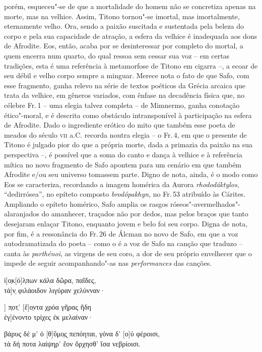 {porém, esqueceu"-se de que a mortalidade do homem não se concretiza apenas na
morte, mas na velhice. Assim, Titono tornou"-se imortal, mas imortalmente,
eternamente velho. Ora, sendo a paixão suscitada e sustentada pela
beleza do corpo e pela sua capacidade de atração, a esfera da velhice é
inadequada aos dons de Afrodite. Eos, então, acaba por se desinteressar por
completo do mortal, a quem encerra num quarto, do qual ressoa sem cessar sua
voz -- em certas tradições, esta é uma referência à metamorfose de Titono em
cigarra --, a ecoar de seu débil e velho corpo sempre a minguar. Merece nota o fato de
que Safo, com esse fragmento, ganha relevo na série de textos poéticos da
Grécia arcaica que trata da velhice, em gêneros variados, com ênfase na
decadência física que, no célebre Fr.\,1 -- uma elegia talvez completa -- de
Mimnermo, ganha conotação ético"-moral, e é descrita como obstáculo
intransponível à participação na esfera de Afrodite.
Dado o ingrediente erótico do mito que também esse poeta de meados do século
\textsc{vii} a.C. recorda noutra elegia -- o Fr.\,4, em que o presente de Titono é
julgado pior do que a própria morte, dada a primazia da paixão na sua perspectiva
--, é possível que a soma do canto e dança à
velhice e à referência mítica no novo fragmento de Safo apontem para um cenário
em que também Afrodite e/ou seu universo tomassem parte. Digno de nota, ainda,
é o modo como Eos se caracteriza, recordando a imagem homérica da Aurora
\textit{rhododáktylos}, ``dedirrósea'', no
epíteto composto \textit{brodópakhyn}, no Fr.\,53 atribuído às Cárites.
Ampliando o epíteto homérico, Safo amplia os rasgos
róseos"-avermelhados"-alaranjados do amanhecer, traçados não por dedos, mas pelos
braços que tanto desejaram enlaçar Titono, enquanto jovem e belo foi seu
corpo. Digna de nota, por fim, é a ressonância do Fr.\,26 de Álcman no novo de Safo, em que a voz autodramatizada do poeta -- como o é a voz de Safo na canção que traduzo -- canta às \textit{parthénoi}, as virgens de seu coro, a dor de seu próprio envelhecer que o impede de seguir acompanhando"-as nas \textit{performances} das canções.

\begin{gkverse}
ἰ]ο̣κ[ό]λ̣πων κάλα δῶρα, παῖδες,\\
        τὰ]ν̣ φιλάοιδον λιγύραν χελύνναν·

] π̣οτ̣’ [ἔ]ο̣ντα χρόα γῆρας ἤδη\\
         ἐγ]ένοντο τρίχες ἐκ μελαίναν·

βάρυς δέ μ’ ὀ [θ]ῦμο̣ς ̣πεπόηται, γόνα δ’ [ο]ὐ φέροισι,\\
τὰ δή ποτα λαίψηρ’ ἔον ὄρχησθ’ ἴσα νεβρίοισι.


\end{gkverse}}
